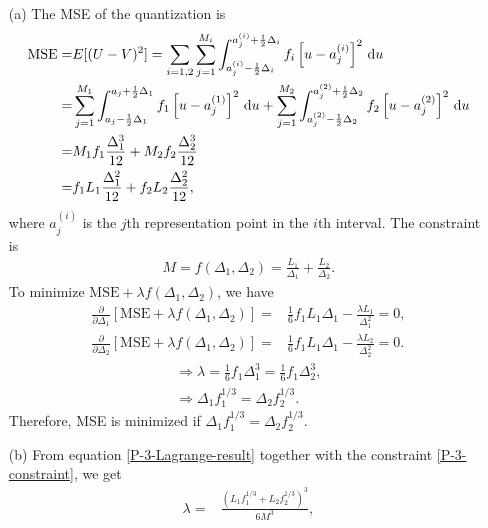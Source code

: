 \documentclass{assignment}
\begin{document}
\begin{sol}
    \begin{itemize}
        \item[(a)] The MSE of the quantization is
        \begin{align}
            \label{P-3-MSE}
            \notag\text{MSE}=&E[(U-V)^2]=\sum_{i=1,2}\sum_{j=1}^{M_i}\int_{a_j^{(i)}-\frac{1}{2}\Delta_i}^{a_j^{(i)}+\frac{1}{2}\Delta_i}f_i\left[u-a_j^{(i)}\right]^2\,\mathrm{d}u\\
            \notag=&\sum_{j=1}^{M_1}\int_{a_j-\frac{1}{2}\Delta_1}^{a_j+\frac{1}{2}\Delta_1}f_1\left[u-a_j^{(1)}\right]^2\,\mathrm{d}u+\sum_{j=1}^{M_2}\int_{a_j^{(2)}-\frac{1}{2}\Delta_2}^{a_j^{(2)}+\frac{1}{2}\Delta_2}f_2\left[u-a_j^{(2)}\right]^2\,\mathrm{d}u\\
            \notag=&M_1f_1\frac{\Delta_1^3}{12}+M_2f_2\frac{\Delta_2^3}{12}\\
            =&f_1L_1\frac{\Delta_1^2}{12}+f_2L_2\frac{\Delta_2^2}{12},
        \end{align}
        where $a_j^{(i)}$ is the $j$th representation point in the $i$th interval.
        The constraint is
        \begin{align}
            \label{P-3-constraint}
            M=f(\Delta_1,\Delta_2)=\frac{L_1}{\Delta_1}+\frac{L_2}{\Delta_2}.
        \end{align}
        To minimize $\text{MSE}+\lambda f(\Delta_1,\Delta_2)$, we have
        \begin{align}
            \frac{\partial}{\partial\Delta_1}[\text{MSE}+\lambda f(\Delta_1,\Delta_2)]=&\frac{1}{6}f_1L_1\Delta_1-\frac{\lambda L_1}{\Delta_1^2}=0,\\
            \frac{\partial}{\partial\Delta_2}[\text{MSE}+\lambda f(\Delta_1,\Delta_2)]=&\frac{1}{6}f_1L_1\Delta_1-\frac{\lambda L_2}{\Delta_2^2}=0.
        \end{align}
        \begin{gather}
            \label{P-3-Lagrange-result}\Longrightarrow\lambda=\frac{1}{6}f_1\Delta_1^3=\frac{1}{6}f_1\Delta_2^3,\\
            \Longrightarrow\Delta_1f_1^{1/3}=\Delta_2f_2^{1/3}.
        \end{gather}
        Therefore, MSE is minimized if $\Delta_1f_1^{1/3}=\Delta_2f_2^{1/3}$.
        \item[(b)] From equation \eqref{P-3-Lagrange-result} together with the constraint \eqref{P-3-constraint}, we get
        \begin{align}
            \lambda=&\frac{(L_1f_1^{1/3}+L_2f_2^{1/3})^3}{6M^3},\\

\end{align}
\end{itemize}
\end{sol}
\end{document}
